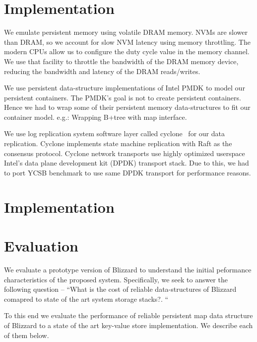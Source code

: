 \section{Implementation}
 We emulate persistent memory using volatile DRAM memory. NVMs are slower than DRAM, so we account for 
slow NVM latency using memory throttling. The modern CPUs allow us to configure the duty cycle value in the memory channel. We use that
facility to throttle the bandwidth of the DRAM memory device, reducing the bandwidth and latency of the DRAM reads/writes. 

We use persistent data-structure implementations of Intel PMDK to model our persistent containers. The PMDK's goal is not to 
create persistent containers. Hence we had to wrap some of their persistent memory data-structures to fit our container model.
e.g.: Wrapping B+tree with map interface.


We use log replication system software layer called cyclone~\cite{cyclone} for our data replication. Cyclone implements 
state machine replication with Raft as the consensus protocol. Cyclone network transports use highly optimized 
userspace Intel's data plane development kit (DPDK) transport stack. Due to this, we had to port YCSB benchmark to
use same DPDK transport for performance reasons.

\section{Implementation}



\section{Evaluation}
We evaluate a prototype version of Blizzard to understand the initial peformance characteristics of the proposed
system. Specifically, we seek to answer the following question -- ``What is the cost of reliable data-structures of
Blizzard comapred to state of the art system storage stacks?. ``

To this end we evaluate the performance of reliable persistent map data structure of Blizzard to a state of the art
key-value store implementation. We describe each of them below.


